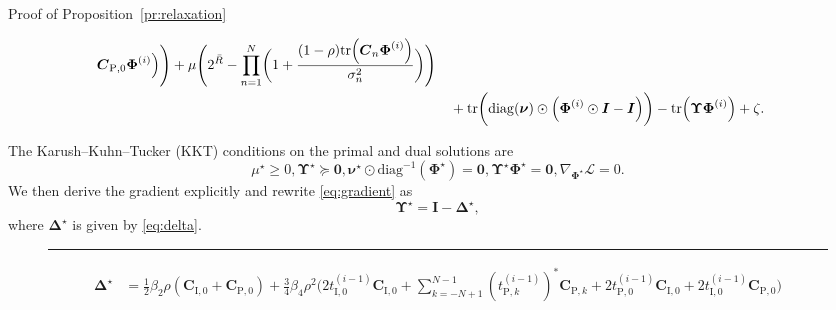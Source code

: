 \documentclass[journal]{IEEEtran}
\begin{document}
\begin{appendix}
\begin{subsection}{Proof of Proposition~\ref{pr:relaxation}}
\begin{figure*}[!b]
\begin{align}
							\boldsymbol{C}_{\mathrm{P},0} \boldsymbol{\Phi}^{(i)}
						\Bigr)
						\Biggr) + \mu \Biggl(
						2^{\bar{R}} - \prod_{n=1}^N \biggl(
							1 + \frac{(1-\rho) \mathrm{tr}\Bigl(
								\boldsymbol{C}_n \boldsymbol{\Phi}^{(i)}
							\Bigr)}{\sigma_n^2}
						\biggr)
					\Biggr)\nonumber\\
					& \quad + \mathrm{tr}\biggl(
						\mathrm{diag}(\boldsymbol{\nu}) \odot \Bigl(
							\boldsymbol{\Phi}^{(i)} \odot \boldsymbol{I} - \boldsymbol{I}
						\Bigr)
					\biggr) - \mathrm{tr} \Bigl(
						\boldsymbol{\Upsilon} \boldsymbol{\Phi}^{(i)}
					\Bigr) + \zeta.
				\end{align}
			\end{figure*}
			The Karush–Kuhn–Tucker (KKT) conditions on the primal and dual solutions are
			\begin{subequations}
				\begin{equation}\label{eq:lagrange_multiplier}
					\mu^\star \ge 0, \boldsymbol{\Upsilon}^\star \succeq \boldsymbol{0},
				\end{equation}
				\begin{equation}\label{eq:complementary_slackness}
					\boldsymbol{\nu}^\star \odot \mathrm{diag}^{-1}(\boldsymbol{\Phi}^\star) = \boldsymbol{0}, \boldsymbol{\Upsilon}^\star \boldsymbol{\Phi}^\star = \boldsymbol{0},
				\end{equation}
				\begin{equation}\label{eq:gradient}
					\nabla_{\boldsymbol{\Phi}^\star} \mathcal{L} = 0.
				\end{equation}
			\end{subequations}
			We then derive the gradient explicitly and rewrite \eqref{eq:gradient} as
			\begin{equation}
				\boldsymbol{\Upsilon}^\star = \boldsymbol{I} - \boldsymbol{\Delta}^\star,
			\end{equation}
			where $\boldsymbol{\Delta}^\star$ is given by \eqref{eq:delta}.
			\begin{figure*}[!b]
				\hrule
				\begin{align}\label{eq:delta}
					\boldsymbol{\Delta}^\star
					& = \frac{1}{2} \beta_2 \rho (\boldsymbol{C}_{\mathrm{I},0}+\boldsymbol{C}_{\mathrm{P},0}) + \frac{3}{4} \beta_4 \rho^2
						\Biggl(
							2 t_{\mathrm{I},0}^{(i-1)} \boldsymbol{C}_{\mathrm{I},0} + \sum_{k=-N+1}^{N-1} (t_{\mathrm{P},k}^{(i-1)})^* \boldsymbol{C}_{\mathrm{P},k} + 2 t_{\mathrm{P},0}^{(i-1)} \boldsymbol{C}_{\mathrm{I},0} + 2 t_{\mathrm{I},0}^{(i-1)} \boldsymbol{C}_{\mathrm{P},0}
						\Biggr)\nonumber\\

\end{align}
\end{figure*}
\end{subsection}
\end{appendix}
\end{document}
